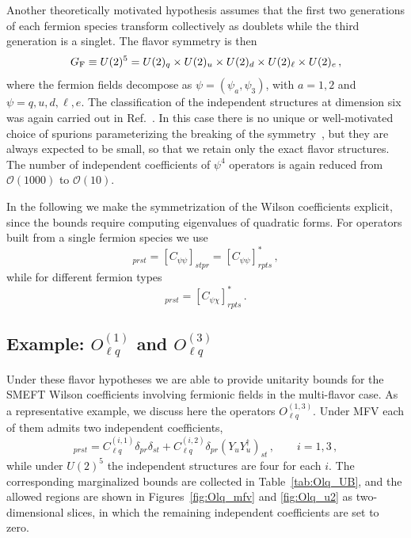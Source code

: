 Another theoretically motivated hypothesis assumes that the first two generations of each fermion
species transform collectively as doublets while the third generation is a singlet. The flavor
symmetry is then
\begin{equation}
    G_{\rm F}\equiv U(2)^5=U(2)_q\times U(2)_u\times U(2)_d\times U(2)_\ell\times U(2)_e\,,
\end{equation}
where the fermion fields decompose as $\psi = (\psi_a,\psi_3)$, with $a=1,2$ and
$\psi=q,u,d,\ell,e$. The classification of the independent structures at dimension six was again
carried out in Ref.~\cite{Faroughy:2020ina}. In this case there is no unique or well-motivated choice
of spurions parameterizing the breaking of the symmetry~\cite{Faroughy:2020ina,Greljo:2022cah}, but
they are always expected to be small, so that we retain only the exact flavor structures. The number
of independent coefficients of $\psi^4$ operators is again reduced from $\mathcal O(1000)$ to
$\mathcal O(10)$.

In the following we make the symmetrization of the Wilson coefficients explicit, since the bounds
require computing eigenvalues of quadratic forms. For operators built from a single fermion species
we use
\begin{equation}
    [C_{\psi\psi}]_{prst}=[C_{\psi\psi}]_{stpr}=[C_{\psi\psi}]^*_{rpts}\,,
\end{equation}
while for different fermion types
\begin{equation}
    [C_{\psi\chi}]_{prst}=[C_{\psi\chi}]^*_{rpts}\,.
\end{equation}

\subsection{\texorpdfstring{Example: $O_{\ell q}^{(1)}$ and $O_{\ell q}^{(3)}$}{Example: Olq(1) and Olq(3)}}

Under these flavor hypotheses we are able to provide unitarity bounds for the SMEFT Wilson
coefficients involving fermionic fields in the multi-flavor case. As a representative example, we
discuss here the operators $O_{\ell q}^{(1,3)}$. Under MFV each of them admits two independent
coefficients,
\begin{equation}
    [C_{\ell q}^{(i)}]_{prst} = C_{\ell q}^{(i,1)}\delta_{pr}\delta_{st}
    + C_{\ell q}^{(i,2)}\delta_{pr}(Y_u Y_u^\dagger)_{st}\,,\qquad i=1,3\,,
\end{equation}
while under $U(2)^5$ the independent structures are four for each $i$. The corresponding marginalized
bounds are collected in Table~\ref{tab:Olq_UB}, and the allowed regions are shown in
Figures~\ref{fig:Olq_mfv} and \ref{fig:Olq_u2} as two-dimensional slices, in which the remaining
independent coefficients are set to zero.

